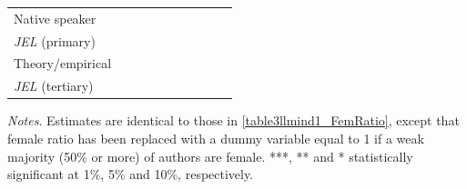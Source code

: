 \begin{table}
\begin{threeparttable}
\begin{tabular}{p{4.5cm}S@{}S@{}S@{}S@{}S@{}S@{}S@{}S@{}S@{}}
            Native speaker                &               &               &               &               &           {}   &           {}   &           {}   &           {}   &           {}   \\
            \textit{JEL} (primary)        &               &               &               &               &               &               &           {}   &               &               \\
            Theory/empirical              &               &               &               &               &               &               &               &           {}   &               \\
            \textit{JEL} (tertiary)       &               &               &               &               &               &               &               &               &           {}   \\
            \bottomrule
        \end{tabular}
        \begin{tablenotes}
            \tiny
            \item \textit{Notes}. Estimates are identical to those in \autoref{table3llmind1_FemRatio}, except that female ratio has been replaced with a dummy variable equal to 1 if a weak majority (50\% or more) of authors are female. ***, ** and * statistically significant at 1\%, 5\% and 10\%, respectively.
        \end{tablenotes}
    \end{threeparttable}

\end{table}
